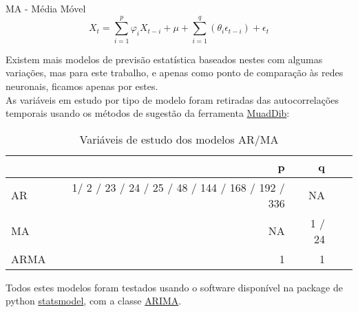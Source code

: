 \bigskip
\gls{MA} - Média Móvel \\

\begin{equation} \label{eq:ma} 
    X_{t} = \sum_{i=1}^{p}\varphi_{i} X_{t-i}  + \mu + \sum_{i=1}^{q}(\theta_{i} \epsilon_{t-i}) + \epsilon_{t}
\end{equation}
\smallskip

Existem mais modelos de previsão estatística baseados nestes com algumas variações, mas para este trabalho, e apenas como ponto de comparação às redes neuronais, ficamos apenas por estes.\\
As variáveis em estudo por tipo de modelo foram retiradas das autocorrelações temporais usando os métodos de sugestão da ferramenta \hyperref[se:muaddib]{MuadDib}:\\


\begin{table}[h] \centering
\begin{tabular}{lrrrr}
    \toprule
     & p & q \\
    \midrule
    \gls{AR} & 1/ 2 / 23 / 24 / 25 / 48 / 144 / 168 / 192 / 336 & NA \\
    \gls{MA} & NA & 1 / 24 \\
    \gls{ARMA} & 1 & 1 \\
    \bottomrule
    \end{tabular}
    \label{tab:varsstats} 
    \caption{Variáveis de estudo dos modelos AR/MA}
\end{table}


Todos estes modelos foram testados usando o software disponível na package de python \href{https://www.statsmodels.org/stable/index.html}{statsmodel}, com a classe \href{https://www.statsmodels.org/stable/generated/statsmodels.tsa.arima.model.ARIMA.html}{ARIMA}.
